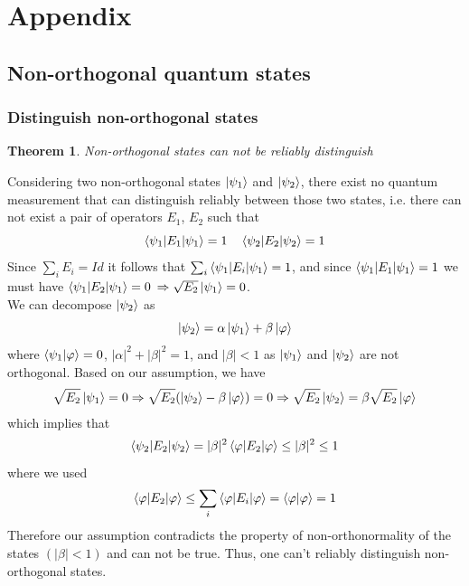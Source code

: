 \documentclass{article}
\newtheorem{theorem}{Theorem}
\begin{document}
\section{Appendix}
\subsection{Non-orthogonal quantum states}
\subsubsection*{Distinguish non-orthogonal states}
\begin{theorem}
    Non-orthogonal states can not be reliably distinguish
\end{theorem}
Considering two non-orthogonal states $\ket{\psi_1}$ and $\ket{\psi_2}$, there
exist no quantum measurement that can distinguish reliably between those two
states, i.e. there can not exist a pair of operators $E_1$, $E_2$ such that
\begin{equation}
    \braket{\psi_1|E_1|\psi_1} = 1 \quad \braket{\psi_2|E_2|\psi_2} = 1
\end{equation}
Since $\sum_iE_i=Id$ it follows that $\sum_i\braket{\psi_1|E_i|\psi_1}=1$, and
since $\braket{\psi_1|E_1|\psi_1} = 1$ we must have $\braket{\psi_1|E_2 |\psi_1}
= 0$ $\Rightarrow \sqrt{E_2}\ket{\psi_1}=0$. \\\noindent
We can decompose $\ket{\psi_2}$ as
\begin{equation}
    \ket{\psi_2} = \alpha\ket{\psi_1}+\beta\ket{\varphi}
\end{equation}
where $\braket{\psi_1|\varphi}=0$, $|\alpha|^2 +|\beta|^2 = 1$, and $|\beta|<1$
as $\ket{\psi_1}$ and $\ket{\psi_2}$ are not orthogonal. Based on our
assumption, we have
\begin{equation}
    \begin{aligned}
        \sqrt{E_2}\ket{\psi_1} = 0
        \Rightarrow \sqrt{E_2}(\ket{\psi_2} - \beta\ket{\varphi}) = 0
        \Rightarrow \sqrt{E_2}\ket{\psi_2} = \beta\sqrt{E_2}\ket{\varphi}
    \end{aligned}
\end{equation}
which implies that
\begin{equation}
    \braket{\psi_2|E_2|\psi_2} = |\beta|^2 \braket{\varphi|E_2|\varphi} \leq |\beta|^2 \leq 1
\end{equation}
where we used
\begin{equation}
\braket{\varphi|E_2|\varphi} \leq \sum_i\braket{\varphi|E_i|\varphi} = \braket{\varphi|\varphi} = 1
\end{equation}
Therefore our assumption contradicts the property of non-orthonormality of the
states $(|\beta|<1)$ and can not be true. Thus, one can't reliably distinguish
non-orthogonal states.
\end{document}
